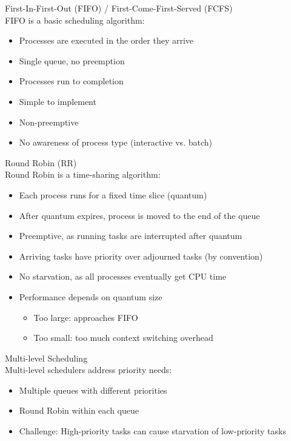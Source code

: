\begin{definition}{First-In-First-Out (FIFO) / First-Come-First-Served (FCFS)}\\
    FIFO is a basic scheduling algorithm:
    \begin{itemize}
        \item Processes are executed in the order they arrive
        \item Single queue, no preemption
        \item Processes run to completion
        \item Simple to implement
        \item Non-preemptive
        \item No awareness of process type (interactive vs. batch)
    \end{itemize}
\end{definition}

\begin{definition}{Round Robin (RR)}\\
    Round Robin is a time-sharing algorithm:
    \begin{itemize}
        \item Each process runs for a fixed time slice (quantum)
        \item After quantum expires, process is moved to the end of the queue
        \item Preemptive, as running tasks are interrupted after quantum
        \item Arriving tasks have priority over adjourned tasks (by convention)
        \item No starvation, as all processes eventually get CPU time
        \item Performance depends on quantum size
            \begin{itemize}
                \item Too large: approaches FIFO
                \item Too small: too much context switching overhead
            \end{itemize}
    \end{itemize}
\end{definition}

\begin{definition}{Multi-level Scheduling}\\
    Multi-level schedulers address priority needs:
    \begin{itemize}
        \item Multiple queues with different priorities
        \item Round Robin within each queue
        \item Challenge: High-priority tasks can cause starvation of low-priority tasks
    \end{itemize}
\end{definition}

